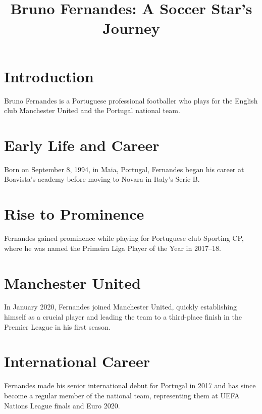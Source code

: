\documentclass{article}
\title{Bruno Fernandes: A Soccer Star's Journey}
\author{}
\date{}
\begin{document}
   \maketitle

   \section*{Introduction}
   Bruno Fernandes is a Portuguese professional footballer who plays for the English club Manchester United and the Portugal national team.

   \section*{Early Life and Career}
   Born on September 8, 1994, in Maia, Portugal, Fernandes began his career at Boavista's academy before moving to Novara in Italy's Serie B.

   \section*{Rise to Prominence}
   Fernandes gained prominence while playing for Portuguese club Sporting CP, where he was named the Primeira Liga Player of the Year in 2017–18.

   \section*{Manchester United}
   In January 2020, Fernandes joined Manchester United, quickly establishing himself as a crucial player and leading the team to a third-place finish in the Premier League in his first season.

   \section*{International Career}
   Fernandes made his senior international debut for Portugal in 2017 and has since become a regular member of the national team, representing them at UEFA Nations League finals and Euro 2020.

   
\end{document}
